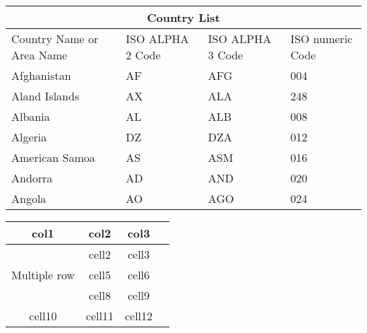 \documentclass{article}
\begin{document}
	\begin{center}
		\begin{tabular}{ |p{3cm}||p{3cm}|p{3cm}|p{3cm}|  }  %
			\hline
			\multicolumn{4}{|c|}{Country List} \\ %
			\hline
			Country Name or Area Name& ISO ALPHA 2 Code &ISO ALPHA 3 Code&ISO numeric Code\\
			\hline
			Afghanistan   & AF    &AFG&   004\\
			Aland Islands&   AX  & ALA   &248\\
			Albania &AL & ALB&  008\\
			Algeria    &DZ & DZA&  012\\
			American Samoa&   AS  & ASM&016\\
			Andorra& AD  & AND   &020\\
			Angola& AO  & AGO&024\\
			\hline
		\end{tabular}
	\end{center}	
		
				
		\begin{center}
			\begin{tabular}{ |c|c|c|c| } 
				\hline
				col1 & col2 & col3 \\
				\hline
				\multirow{3}{4em}{Multiple row} & cell2 & cell3 \\ 
				& cell5 & cell6 \\ \cline{2-3} %
				& cell8 & cell9 \\ 
				\hline
				cell10 & cell11 & cell12 \\ 
				\hline
			\end{tabular}
		\end{center}
\end{document}
